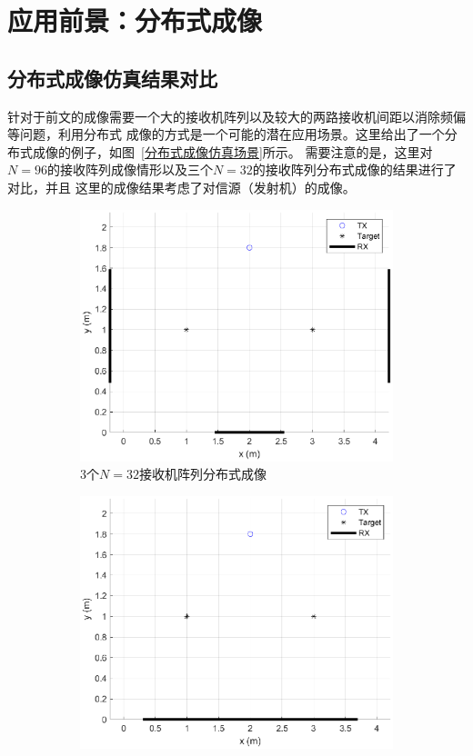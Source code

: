 \section{应用前景：分布式成像}
\subsection{分布式成像仿真结果对比}
针对于前文的成像需要一个大的接收机阵列以及较大的两路接收机间距以消除频偏等问题，利用分布式
成像的方式是一个可能的潜在应用场景。这里给出了一个分布式成像的例子，如图~\ref{分布式成像仿真场景}所示。
需要注意的是，这里对$N=96$的接收阵列成像情形以及三个$N=32$的接收阵列分布式成像的结果进行了对比，并且
这里的成像结果考虑了对信源（发射机）的成像。
\begin{figure}[H]
  \centering
  \begin{subfigure}[t]{.45\linewidth}
    \centering
    \includegraphics[width=1\textwidth]{figures/distribution/model1_circ.eps}
    \caption{$3$个$N=32$接收机阵列分布式成像}  
  \end{subfigure}
  \begin{subfigure}[t]{.45\linewidth}
    \centering
    \includegraphics[width=1\textwidth]{figures/distribution/model1.eps}

\end{subfigure}
\end{figure}
